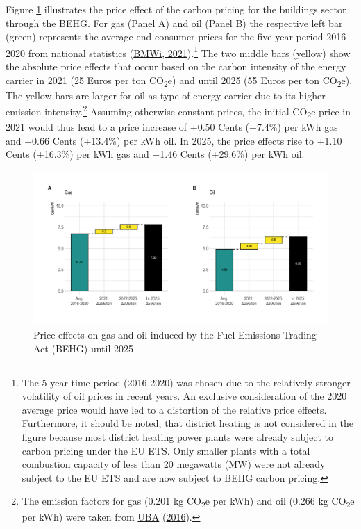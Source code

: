 \documentclass[12pt,twoside]{reedthesis}
\begin{document}
Figure \ref{fig:behg} illustrates the price effect of the carbon pricing for the buildings sector through the BEHG. For gas (Panel A) and oil (Panel B) the respective left bar (green) represents the average end consumer prices for the five-year period 2016-2020 from national statistics (\protect\hyperlink{ref-bmwi21}{BMWi, 2021}).\footnote{The 5-year time period (2016-2020) was chosen due to the relatively stronger volatility of oil prices in recent years. An exclusive consideration of the 2020 average price would have led to a distortion of the relative price effects. Furthermore, it should be noted, that district heating is not considered in the figure because most district heating power plants were already subject to carbon pricing under the EU ETS. Only smaller plants with a total combustion capacity of less than 20 megawatts (MW) were not already subject to the EU ETS and are now subject to BEHG carbon pricing.} The two middle bars (yellow) show the absolute price effects that occur based on the carbon intensity of the energy carrier in 2021 (25 Euros per ton CO\textsubscript{2}e) and until 2025 (55 Euros per ton CO\textsubscript{2}e). The yellow bars are larger for oil as type of energy carrier due to its higher emission intensity.\footnote{The emission factors for gas (0.201 kg CO\textsubscript{2}e per kWh) and oil (0.266 kg CO\textsubscript{2}e per kWh) were taken from \protect\hyperlink{ref-uba16}{UBA} (\protect\hyperlink{ref-uba16}{2016}).} Assuming otherwise constant prices, the initial CO\textsubscript{2}e price in 2021 would thus lead to a price increase of +0.50 Cents (+7.4\%) per kWh gas and +0.66 Cents (+13.4\%) per kWh oil. In 2025, the price effects rise to +1.10 Cents (+16.3\%) per kWh gas and +1.46 Cents (+29.6\%) per kWh oil.
\begin{figure}

{\centering \includegraphics[width=1\linewidth]{figure/price_effect_behg} 

}

\caption[BEHG carbon price effects on gas and oil until 2025]{Price effects on gas and oil induced by the Fuel Emissions Trading Act (BEHG) until 2025}\label{fig:behg}
\end{figure}
\end{document}
